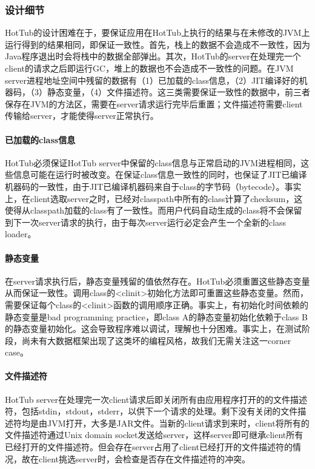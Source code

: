 \documentclass[lang=cn,12pt,a4paper,cite=authoryear]{elegantpaper}
\begin{document}
\subsubsection{设计细节}
HotTub的设计困难在于，要保证应用在HotTub上执行的结果与在未修改的JVM上运行得到的结果相同，即保证一致性。首先，栈上的数据不会造成不一致性，因为Java程序退出时会将栈中的数据全部弹出。其次，HotTub的server在处理完一个client的请求之后即运行GC，堆上的数据也不会造成不一致性的问题。在JVM server进程地址空间中残留的数据有（1）已加载的class信息，（2）JIT编译好的机器码，（3）静态变量，（4）文件描述符。这三类需要保证一致性的数据中，前三者保存在JVM的方法区，需要在server请求运行完毕后重置；文件描述符需要client传输给server，才能使得server正常执行。

\paragraph{已加载的class信息}
HotTub必须保证HotTub server中保留的class信息与正常启动的JVM进程相同，这些信息可能在运行时被改变。在保证class信息一致性的同时，也保证了JIT已编译机器码的一致性，由于JIT已编译机器码来自于class的字节码（bytecode）。事实上，在client选取server之时，已经对classpath中所有的class计算了checksum，这使得从classpath加载的class有了一致性。而用户代码自动生成的class将不会保留到下一次server请求的执行，由于每次server运行必定会产生一个全新的class loader。

\paragraph{静态变量}
在server请求执行后，静态变量残留的值依然存在。HotTub必须重置这些静态变量从而保证一致性。调用class的<clinit>初始化方法即可重置这些静态变量。然而，需要保证每个class的<clinit>函数的调用顺序正确。事实上，有初始化时间依赖的静态变量是bad programming practice，即class A的静态变量初始化依赖于class B的静态变量初始化。这会导致程序难以调试，理解也十分困难。事实上，在测试阶段，尚未有大数据框架出现了这类坏的编程风格，故我们无需关注这一corner case。

\paragraph{文件描述符}
HotTub server在处理完一次client请求后即关闭所有由应用程序打开的的文件描述符，包括stdin，stdout，stderr，以供下一个请求的处理。剩下没有关闭的文件描述符均是由JVM打开，大多是JAR文件。当新的client请求到来时，client将所有的文件描述符通过Unix domain socket发送给server，这样server即可继承client所有已经打开的文件描述符。但会存在server占用了client已经打开的文件描述符的情况，故在client挑选server时，会检查是否存在文件描述符的冲突。
\end{document}
